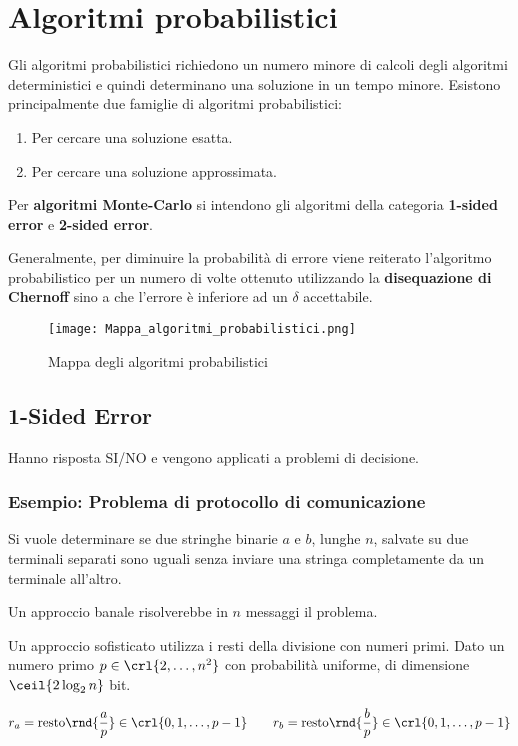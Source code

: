 \documentclass[\main/main.tex]{subfiles}
\begin{document}
\chapter{Algoritmi probabilistici}
Gli algoritmi probabilistici richiedono un numero minore di calcoli degli algoritmi deterministici e quindi determinano una soluzione in un tempo minore. Esistono principalmente due famiglie di algoritmi probabilistici:

\begin{enumerate}
	\item Per cercare una soluzione esatta.
	\item Per cercare una soluzione approssimata.
\end{enumerate}

Per \textbf{algoritmi Monte-Carlo} si intendono gli algoritmi della categoria \textbf{1-sided error} e \textbf{2-sided error}.

Generalmente, per diminuire la probabilità di errore viene reiterato l'algoritmo probabilistico per un numero di volte ottenuto utilizzando la \textbf{disequazione di Chernoff} sino a che l'errore è inferiore ad un \(\delta \) accettabile.

\begin{figure}
	\texttt{[image: Mappa\_algoritmi\_probabilistici.png]}
	\caption{Mappa degli algoritmi probabilistici}
\end{figure}

\section{1-Sided Error}
Hanno risposta SI/NO e vengono applicati a problemi di decisione.

\subsection{Esempio: Problema di protocollo di comunicazione}
Si vuole determinare se due stringhe binarie \(a\) e \(b\), lunghe \(n\), salvate su due terminali separati sono uguali senza inviare una stringa completamente da un terminale all'altro.

Un approccio banale risolverebbe in \(n\) messaggi il problema.

Un approccio sofisticato utilizza i resti della divisione con numeri primi. Dato un numero primo \(p \in \crl{2, \ldots, n^2}\) con probabilità uniforme, di dimensione \(\ceil{2\log_2{n}}\) bit.

\[
	r_a = \text{resto}\rnd{\frac{a}{p}} \in \crl{0,1, \ldots, p-1} \qquad r_b = \text{resto}\rnd{\frac{b}{p}} \in \crl{0,1, \ldots, p-1}
\]
\end{document}
